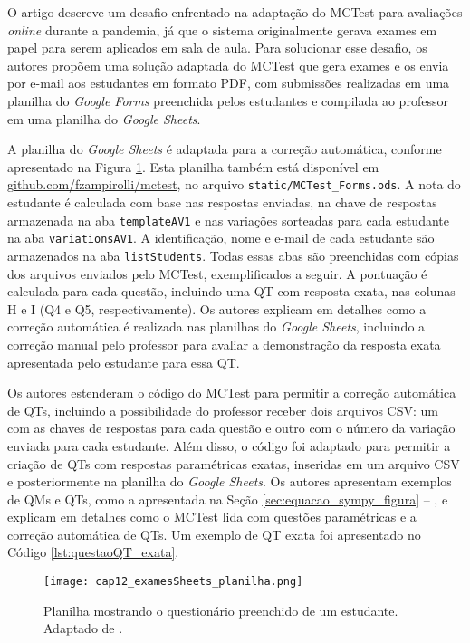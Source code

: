 O artigo descreve um desafio enfrentado na adaptação do MCTest para avaliações \textit{online} durante a pandemia, já que o sistema originalmente gerava exames em papel para serem aplicados em sala de aula. Para solucionar esse desafio, os autores propõem uma solução adaptada do MCTest que gera exames e os envia por e-mail aos estudantes em formato PDF, com submissões realizadas em uma planilha do \textit{Google Forms} preenchida pelos estudantes e compilada ao professor em uma planilha do \textit{Google Sheets}.

A planilha do \textit{Google Sheets} é adaptada para a correção automática, conforme apresentado na Figura \ref{fig:cap12_examesSheets_planilha}. Esta planilha também está disponível em \href{https://github.com/fzampirolli/mctest}{github.com/fzampirolli/mctest}, no arquivo \verb|static/MCTest_Forms.ods|. A nota do estudante é calculada com base nas respostas enviadas, na chave de respostas armazenada na aba \verb|templateAV1| e nas variações sorteadas para cada estudante na aba \verb|variationsAV1|. A identificação, nome e e-mail de cada estudante são armazenados na aba \verb|listStudents|. Todas essas abas são preenchidas com cópias dos arquivos enviados pelo MCTest, exemplificados a seguir. A pontuação é calculada para cada questão, incluindo uma QT com resposta exata, nas colunas H e I (Q4 e Q5, respectivamente). Os autores explicam em detalhes como a correção automática é realizada nas planilhas do \textit{Google Sheets}, incluindo a correção manual pelo professor para avaliar a demonstração da resposta exata apresentada pelo estudante para essa QT.

Os autores estenderam o código do MCTest para permitir a correção automática de QTs, incluindo a possibilidade do professor receber dois arquivos CSV: um com as chaves de respostas para cada questão e outro com o número da variação enviada para cada estudante. Além disso, o código foi adaptado para permitir a criação de QTs com respostas paramétricas exatas, inseridas em um arquivo CSV e posteriormente na planilha do \textit{Google Sheets}. Os autores apresentam exemplos de QMs e QTs, como a apresentada na Seção \ref{sec:equacao_sympy_figura} -- , e explicam em detalhes como o MCTest lida com questões paramétricas e a correção automática de QTs. Um exemplo de QT exata foi apresentado no Código \ref{lst:questaoQT_exata}.

\begin{figure}[!ht]
\centering
  \texttt{[image: cap12\_examesSheets\_planilha.png]}
  \caption{Planilha mostrando o questionário preenchido de um estudante. Adaptado de .}
  \label{fig:cap12_examesSheets_planilha}
\end{figure}

